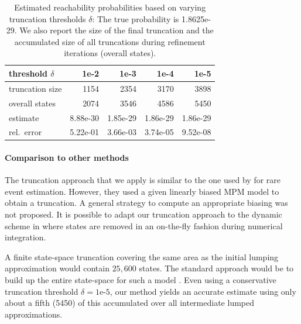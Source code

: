 \setlength{\tabcolsep}{10pt}
\begin{table}[!t]
    \centering
    \begin{tabular}{lrrrr}
    \toprule
    threshold $\delta$ & 1e-2 & 1e-3 & 1e-4 & 1e-5 \\
    \midrule
    truncation size & 1154 & 2354 & 3170 & 3898 \\
    overall states & 2074 & 3546 & 4586 & 5450 \\
    estimate& 8.88e-30 & 1.85e-29 & 1.86e-29 & 1.86e-29\\
    rel.\ error& 5.22e-01 & 3.66e-03 & 3.74e-05 & 9.52e-08\\
    \bottomrule
    \end{tabular}
    \caption{Estimated reachability probabilities based on varying truncation thresholds $\delta$: The true probability is
    1.8625e-29. We also report the size of the final truncation and the accumulated size of all truncations during refinement iterations (overall states).}
    \label{tab:par_poisson}
\end{table}

\paragraph{Comparison to other methods}
The truncation approach that we apply  is similar  to the one used by \citet{mikeev2013numerical} for rare event estimation.
However,  they used a given linearly biased MPM model to obtain a truncation. A general strategy to compute an appropriate biasing was not proposed.
It is possible to adapt our truncation approach to the dynamic scheme in \citet{mikeev2013numerical} where states are removed in an on-the-fly fashion during numerical integration.

A finite state-space truncation covering the same area as the initial lumping approximation would contain $25,\!600$ states.
The standard approach would be to build up the entire state-space for such a model \cite{kwiatkowska2011prism}.
Even using a conservative truncation threshold $\delta=\text{1e-5}$, our method yields an accurate estimate using only about a fifth (5450) of this accumulated over all intermediate lumped approximations. 

